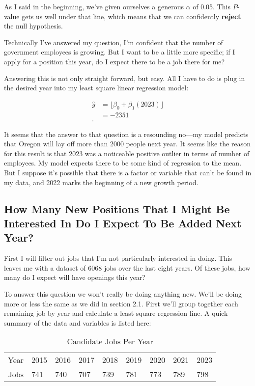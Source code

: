 \documentclass[letterpaper]{article}
\theoremstyle{definition}
\begin{document}
As I said in the beginning, we've given ourselves a generous $\alpha$ of 0.05. This
$P$-value gets us well under that line, which means that we can confidently
\textbf{reject} the null hypothesis.

Technically I've answered my question, I'm confident that the number of government
employees is growing. But I want to be a little more specific; if I apply for a position
this year, do I expect there to be a job there for me?

Answering this is not only straight forward, but easy. All I have to do is plug in the
desired year into my least square linear regression model:

\begin{align*}
	\hat{y} &= \lfloor \beta_0 + \beta_1(2023)\rfloor\\
	&=  -2351\\
.\end{align*}	

It seems that the answer to that question is a resounding no---my model predicts that Oregon
will lay off more than 2000 people next year. It seems like the reason for this result is
that 2023 was a noticeable positive outlier in terms of number of employees. My model
expects there to be some kind of regression to the mean. But I suppose it's possible that
there is a factor or variable that can't be found in my data, and 2022 marks the beginning
of a new growth period. 




    

    
    \hypertarget{how-many-new-positions-that-i-might-be-interested-in-do-i-expect-to-be-added-next-year}{%
\subsection{How Many New Positions That I Might Be Interested In Do I
Expect To Be Added Next
Year?}\label{how-many-new-positions-that-i-might-be-interested-in-do-i-expect-to-be-added-next-year}}

First I will filter out jobs that I'm not particularly interested in doing. This leaves
me with a dataset of 6068 jobs over the last eight years. Of these jobs, how many do I
expect will have openings this year?

To answer this question we won't really be doing anything new. We'll be doing more or less
the same as we did in section 2.1. First we'll group together each remaining job by year
and calculate a least square regression line. A quick summary of the data and variables is
listed here:
\begin{table}[H]
	\centering
	\caption{Candidate Jobs Per Year}
	\label{tab:label}
	\begin{tabular}{r|llllllll}
		Year & 2015& 2016&2017&2018&2019&2020&2021&2023\\
		Jobs & 741& 740& 707& 739& 781&773& 789&798
	\end{tabular}
\end{table}
\end{document}
